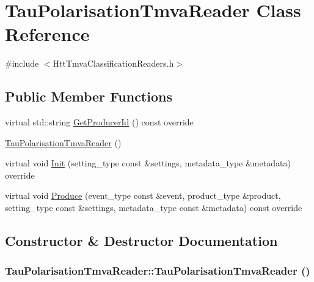 \hypertarget{classTauPolarisationTmvaReader}{
\section{TauPolarisationTmvaReader Class Reference}
\label{classTauPolarisationTmvaReader}
}


{\ttfamily \#include $<$HttTmvaClassificationReaders.h$>$}\subsection*{Public Member Functions}
\begin{DoxyCompactItemize}
\item 
virtual std::string \hyperlink{classTauPolarisationTmvaReader_a6c12a96ffe02b1fda29fa1060312496c}{GetProducerId} () const override
\item 
\hyperlink{classTauPolarisationTmvaReader_a0e95c563ab5cdb09a52c093cf1158069}{TauPolarisationTmvaReader} ()
\item 
virtual void \hyperlink{classTauPolarisationTmvaReader_a3ee9dcc6997a4c873aa516a626d2b9e1}{Init} (setting\_\-type const \&settings, metadata\_\-type \&metadata) override
\item 
virtual void \hyperlink{classTauPolarisationTmvaReader_abcee9b0dd083c969f2597401c8a56e1d}{Produce} (event\_\-type const \&event, product\_\-type \&product, setting\_\-type const \&settings, metadata\_\-type const \&metadata) const override
\end{DoxyCompactItemize}


\subsection{Constructor \& Destructor Documentation}
\hypertarget{classTauPolarisationTmvaReader_a0e95c563ab5cdb09a52c093cf1158069}{
\subsubsection[{TauPolarisationTmvaReader}]{\setlength{\rightskip}{0pt plus 5cm}TauPolarisationTmvaReader::TauPolarisationTmvaReader ()}}
\label{classTauPolarisationTmvaReader_a0e95c563ab5cdb09a52c093cf1158069}


